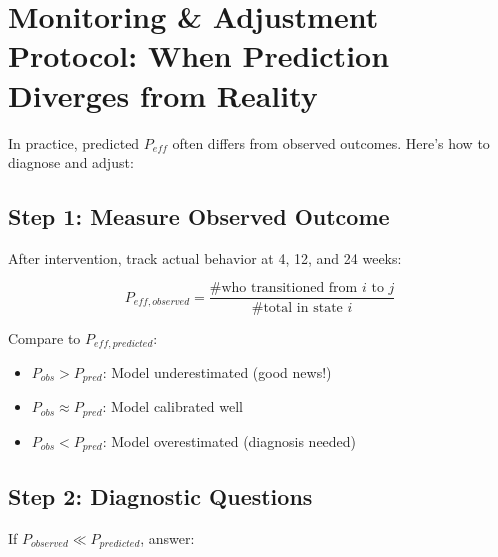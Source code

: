 \section{Monitoring \& Adjustment Protocol: When Prediction Diverges from Reality}\label{sec:ch16-monitoring}

In practice, predicted $P_{eff}$ often differs from observed outcomes. Here's how to diagnose and adjust:

\subsection{Step 1: Measure Observed Outcome}

After intervention, track actual behavior at 4, 12, and 24 weeks:

\begin{equation}
P_{eff,observed} = \frac{\text{\# who transitioned from } i \text{ to } j}{\text{\# total in state } i}
\end{equation}

Compare to $P_{eff,predicted}$:

\begin{itemize}[nosep]
    \item $P_{obs} > P_{pred}$: Model underestimated (good news!)
    \item $P_{obs} \approx P_{pred}$: Model calibrated well
    \item $P_{obs} < P_{pred}$: Model overestimated (diagnosis needed)
\end{itemize}

\subsection{Step 2: Diagnostic Questions}

If $P_{observed} \ll P_{predicted}$, answer:

